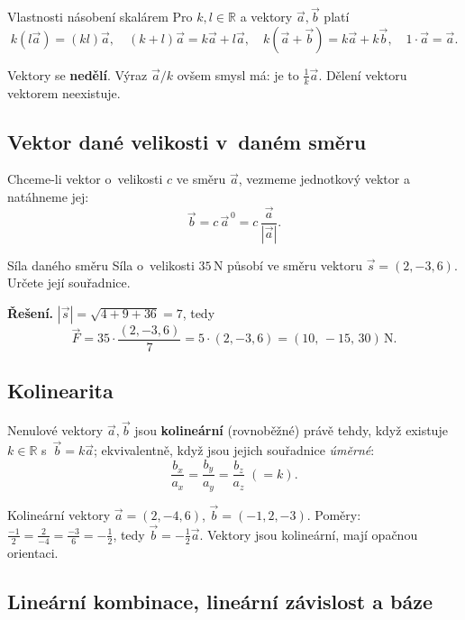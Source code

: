 \documentclass[a4paper,11pt]{article}
\newcommand{\R}{\mathbb{R}}
\newcommand{\abs}[1]{\left\lvert #1\right\rvert}
\newcommand{\jed}[1]{\,\mathrm{#1}}      %
\begin{document}
\begin{veta}{Vlastnosti násobení skalárem}
Pro $k,l\in\R$ a vektory $\vec a,\vec b$ platí
\[
  k(l\vec a)=(kl)\vec a,\quad
  (k+l)\vec a=k\vec a+l\vec a,\quad
  k(\vec a+\vec b)=k\vec a+k\vec b,\quad
  1\cdot\vec a=\vec a .
\]
\end{veta}

\begin{poznamka}
Vektory se \textbf{nedělí}. Výraz $\vec a/k$ ovšem smysl má: je to
$\tfrac1k\vec a$. Dělení vektoru vektorem neexistuje.
\end{poznamka}

\subsection{Vektor dané velikosti v~daném směru}

Chceme-li vektor o~velikosti $c$ ve směru $\vec a$, vezmeme jednotkový vektor
a natáhneme jej:
\begin{equation}
  \vec b=c\,\vec a^{\,0}=c\,\frac{\vec a}{\abs{\vec a}} .
\end{equation}

\begin{priklad}{Síla daného směru}
Síla o~velikosti $35\jed{N}$ působí ve směru vektoru $\vec s=(2,-3,6)$. Určete její
souřadnice.

\medskip\noindent\textbf{Řešení.} $\abs{\vec s}=\sqrt{4+9+36}=7$, tedy
\[
  \vec F=35\cdot\frac{(2,-3,6)}{7}=5\cdot(2,-3,6)=(10,\,-15,\,30)\jed{N}.
\]
\end{priklad}

\subsection{Kolinearita}

Nenulové vektory $\vec a,\vec b$ jsou \textbf{kolineární} (rovnoběžné) právě tehdy,
když existuje $k\in\R$ s~$\vec b=k\vec a$; ekvivalentně, když jsou jejich souřadnice
\emph{úměrné}:
\[
  \frac{b_x}{a_x}=\frac{b_y}{a_y}=\frac{b_z}{a_z}\;(=k).
\]

\begin{priklad}{Kolineární vektory}
$\vec a=(2,-4,6)$, $\vec b=(-1,2,-3)$.
Poměry: $\tfrac{-1}{2}=\tfrac{2}{-4}=\tfrac{-3}{6}=-\tfrac12$, tedy $\vec b=-\tfrac12\vec a$.
Vektory jsou kolineární, mají opačnou orientaci.
\end{priklad}

\subsection{Lineární kombinace, lineární závislost a báze}
\end{document}
